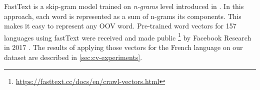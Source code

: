 FastText is a skip-gram model trained on \textit{n-grams} level
introduced in \cite{Bojanowski-ACL2017}. In this approach, each word
is represented as a sum of n-grams its
components. This makes it easy to represent any OOV word. Pre-trained word vectors for 157 languages using fastText were received and made public \footnote{\url{https://fasttext.cc/docs/en/crawl-vectors.html}} by Facebook Research in 2017 \citep{Mikolov-2017}. The results of applying those vectors for the French language on our dataset are described in \ref{sec:cv-experiments}.


